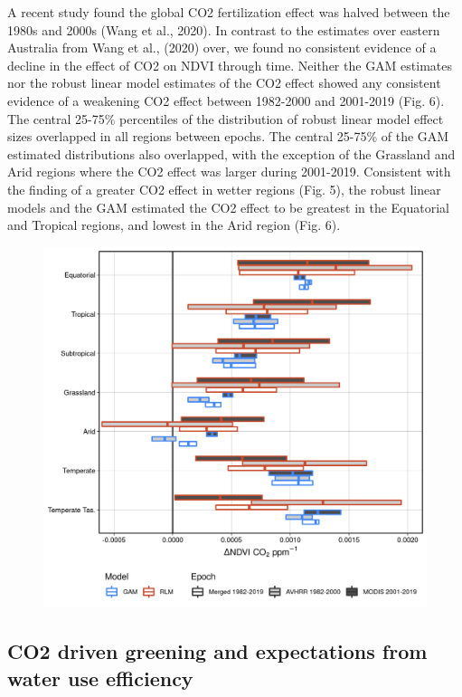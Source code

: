 \documentclass[gc, manuscript]{copernicus}
\begin{document}
A recent study found the global CO2 fertilization effect was halved
between the 1980s and 2000s (Wang et al., 2020). In contrast to the
estimates over eastern Australia from Wang et al., (2020) over, we found
no consistent evidence of a decline in the effect of CO2 on NDVI through
time. Neither the GAM estimates nor the robust linear model estimates of
the CO2 effect showed any consistent evidence of a weakening CO2 effect
between 1982-2000 and 2001-2019 (Fig. 6). The central 25-75\%
percentiles of the distribution of robust linear model effect sizes
overlapped in all regions between epochs. The central 25-75\% of the GAM
estimated distributions also overlapped, with the exception of the
Grassland and Arid regions where the CO2 effect was larger during
2001-2019. Consistent with the finding of a greater CO2 effect in wetter
regions (Fig. 5), the robust linear models and the GAM estimated the CO2
effect to be greatest in the Equatorial and Tropical regions, and lowest
in the Arid region (Fig. 6). \clearpage

\begin{figure}
\includegraphics[width=14cm]{../../figures/Fig6_rlm_CO2_effect_by_epoch} \end{figure}
\clearpage

\subsection{CO2 driven greening and expectations from water use
efficiency}
\end{document}
